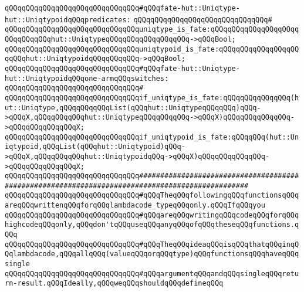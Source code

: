 \newline
\verb|qQQqqQQqqQQqqQQqqQQqqQQqqQQqqQQq#qQQqfate-hut::Uniqtype-hut::UniqtypoidqQQqpredicates:|\newline
\verb|qQQqqQQqqQQqqQQqqQQqqQQqqQQqqQQq#|\newline
\verb|qQQqqQQqqQQqqQQqqQQqqQQqqQQqqQQquniqtype_is_fate:qQQqqQQqqQQqqQQqqQQqqQQqqQQqqQQqhut::UniqtypeqQQqqQQqqQQqqQQqqQQq->qQQqBool;|\newline
\verb|qQQqqQQqqQQqqQQqqQQqqQQqqQQqqQQquniqtypoid_is_fate:qQQqqQQqqQQqqQQqqQQqqQQqhut::UniqtypoidqQQqqQQqqQQq->qQQqBool;|\newline
\newline
\verb|qQQqqQQqqQQqqQQqqQQqqQQqqQQqqQQq#qQQqfate-hut::Uniqtype-hut::UniqtypoidqQQqone-armqQQqswitches:|\newline
\verb|qQQqqQQqqQQqqQQqqQQqqQQqqQQqqQQq#|\newline
\verb|qQQqqQQqqQQqqQQqqQQqqQQqqQQqqQQqif_uniqtype_is_fate:qQQqqQQqqQQqqQQq(hut::Uniqtype,qQQqqQQqqQQqList(qQQqhut::UniqtypeqQQqqQQq)qQQq->qQQqX,qQQqqQQqqQQqhut::UniqtypeqQQqqQQqqQQq->qQQqX)qQQqqQQqqQQqqQQq->qQQqqQQqqQQqqQQqX;|\newline
\verb|qQQqqQQqqQQqqQQqqQQqqQQqqQQqqQQqif_uniqtypoid_is_fate:qQQqqQQq(hut::Uniqtypoid,qQQqList(qQQqhut::Uniqtypoid)qQQq->qQQqX,qQQqqQQqqQQqhut::UniqtypoidqQQq->qQQqX)qQQqqQQqqQQqqQQq->qQQqqQQqqQQqqQQqX;|\newline
\newline
\newline
\newline
\newline
\newline
\verb|qQQqqQQqqQQqqQQqqQQqqQQqqQQqqQQq################################################################################################|\newline
\verb|qQQqqQQqqQQqqQQqqQQqqQQqqQQqqQQq#qQQqTheqQQqfollowingqQQqfunctionsqQQqareqQQqwrittenqQQqforqQQqlambdacode_typeqQQqonly.qQQqIfqQQqyou|\newline
\verb|qQQqqQQqqQQqqQQqqQQqqQQqqQQqqQQq#qQQqareqQQqwritingqQQqcodeqQQqforqQQqhighcodeqQQqonly,qQQqdon'tqQQquseqQQqanyqQQqofqQQqtheseqQQqfunctions.qQQq|\newline
\verb|qQQqqQQqqQQqqQQqqQQqqQQqqQQqqQQq#qQQqTheqQQqideaqQQqisqQQqthatqQQqinqQQqlambdacode,qQQqallqQQq(valueqQQqorqQQqtype)qQQqfunctionsqQQqhaveqQQqsingle|\newline
\verb|qQQqqQQqqQQqqQQqqQQqqQQqqQQqqQQq#qQQqargumentqQQqandqQQqsingleqQQqreturn-result.qQQqIdeally,qQQqweqQQqshouldqQQqdefineqQQq|\newline
